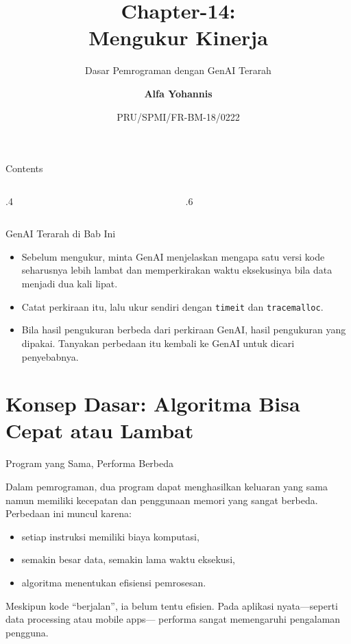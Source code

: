 \documentclass[aspectratio=169, table]{beamer}
\subtitle{Dasar Pemrograman dengan GenAI Terarah}
\title{Chapter-14:\\\LARGE{Mengukur Kinerja\\}
\vspace{10pt}}
\date[Serial]{\scriptsize {PRU/SPMI/FR-BM-18/0222}}
\author[Pradita]{\small{\textbf{Alfa Yohannis}}}
\begin{document}
\frame{\titlepage}

\begin{frame}[fragile]{Contents}
\vspace{15pt}
\begin{columns}[t]
\begin{column}{.4\textwidth}
\tableofcontents[sections={1-4}]
\end{column}
\begin{column}{.6\textwidth}
\tableofcontents[sections={5-7}]
\end{column}
\end{columns}
\end{frame}

\begin{frame}{GenAI Terarah di Bab Ini}
\small
\begin{itemize}
  \item Sebelum mengukur, minta GenAI menjelaskan mengapa satu versi kode seharusnya lebih lambat dan memperkirakan waktu eksekusinya bila data menjadi dua kali lipat.
  \item Catat perkiraan itu, lalu ukur sendiri dengan \texttt{timeit} dan \texttt{tracemalloc}.
  \item Bila hasil pengukuran berbeda dari perkiraan GenAI, hasil pengukuran yang dipakai. Tanyakan perbedaan itu kembali ke GenAI untuk dicari penyebabnya.
\end{itemize}
\end{frame}

\section{Konsep Dasar: Algoritma Bisa Cepat atau Lambat}

\begin{frame}{Program yang Sama, Performa Berbeda}
\vspace{10pt}

Dalam pemrograman, dua program dapat menghasilkan keluaran yang sama
namun memiliki kecepatan dan penggunaan memori yang sangat berbeda.
Perbedaan ini muncul karena:

\begin{itemize}
    \item setiap instruksi memiliki biaya komputasi,
    \item semakin besar data, semakin lama waktu eksekusi,
    \item algoritma menentukan efisiensi pemrosesan.
\end{itemize}

Meskipun kode “berjalan”, ia belum tentu efisien.
Pada aplikasi nyata—seperti data processing atau mobile apps—
performa sangat memengaruhi pengalaman pengguna.

\end{frame}
\end{document}
